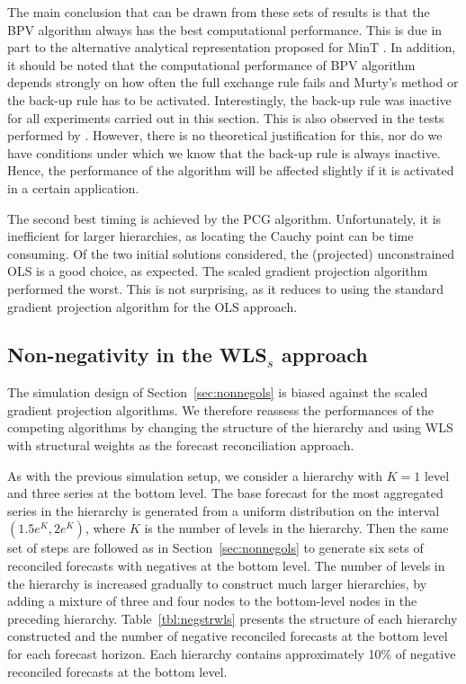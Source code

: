 \documentclass[11pt]{article}
\newcommand{\0}{\phantom{0}}
\begin{document}
The main conclusion that can be drawn from these sets of results is that the BPV algorithm always has the best computational performance. This is due in part to the alternative analytical representation proposed for MinT \citep{Wick2018}. In addition, it should be noted that the computational performance of BPV algorithm depends strongly on how often the full exchange rule fails and Murty's method or the back-up rule has to be activated. Interestingly, the back-up rule was inactive for all experiments carried out in this section. This is also observed in the tests performed by \citet{Kim2011}. However, there is no theoretical justification for this, nor do we have conditions under which we know that the back-up rule is always inactive. Hence, the performance of the algorithm will be affected slightly if it is activated in a certain application.

The second best timing is achieved by the PCG algorithm. Unfortunately, it is inefficient for larger hierarchies, as locating the Cauchy point can be time consuming. Of the two initial solutions considered, the (projected) unconstrained OLS is a good choice, as expected. The scaled gradient projection algorithm performed the worst. This is not surprising, as it reduces to using the standard gradient projection algorithm for the OLS approach.

\subsection[Non-negativity in the WLSs approach]{Non-negativity in the WLS$_{s}$ approach}
\label{sec:nonnegwls}
The simulation design of Section~\ref{sec:nonnegols} is biased against the scaled gradient projection algorithms. We therefore reassess the performances of the competing algorithms by changing the structure of the hierarchy and using WLS with structural weights as the forecast reconciliation approach.

As with the previous simulation setup, we consider a hierarchy with $K=1$ level and three series at the bottom level. The base forecast for the most aggregated series in the hierarchy is generated from a uniform distribution on the interval $(1.5e^{K}, 2e^{K})$, where $K$ is the number of levels in the hierarchy. Then the same set of steps are followed as in Section~\ref{sec:nonnegols} to generate six sets of reconciled forecasts with negatives at the bottom level. The number of levels in the hierarchy is increased gradually to construct much larger hierarchies, by adding a mixture of three and four nodes to the bottom-level nodes in the preceding hierarchy. Table~\ref{tbl:negstrwls} presents the structure of each hierarchy constructed and the number of negative reconciled forecasts at the bottom level for each forecast horizon. Each hierarchy contains approximately 10\% of negative reconciled forecasts at the bottom level.
\end{document}
